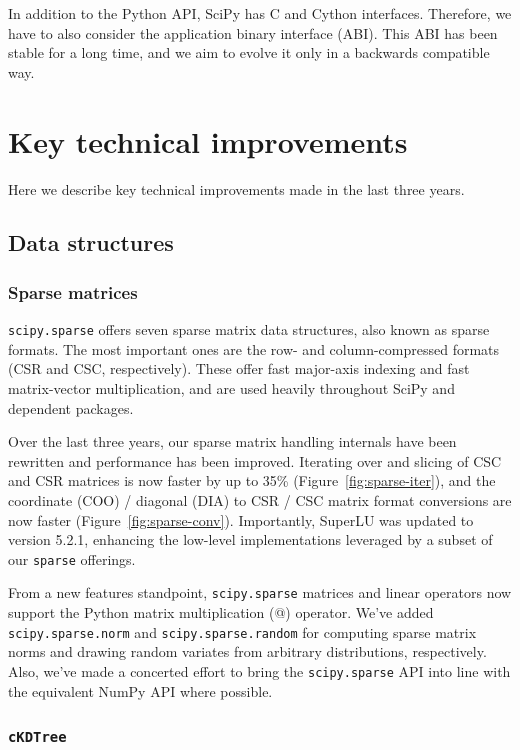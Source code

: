 \documentclass[fleqn,10pt]{wlscirep}
\begin{document}
In addition to the Python API, SciPy has C and Cython interfaces.
Therefore, we have to also consider the application binary
interface (ABI). This ABI has been stable for a long time, and we aim to
evolve it only in a backwards compatible way.

\section*{Key technical improvements}
\label{sec:technical_improvements}
Here we describe key technical improvements made in the last three years.

\subsection*{Data structures}

\subsubsection*{Sparse matrices}

\texttt{scipy.sparse} offers seven sparse matrix data structures,
also known as sparse formats. The most important ones are the row- 
and column-compressed formats (CSR and CSC, respectively). 
These offer fast major-axis indexing and fast matrix-vector multiplication,
and are used heavily throughout SciPy and dependent packages.

Over the last three years, our sparse matrix handling internals have been
rewritten and performance has been improved. Iterating over and slicing of CSC
and CSR matrices is now faster by up to 35\% (Figure~\ref{fig:sparse-iter}),
 and the coordinate (COO) / diagonal (DIA) to CSR / CSC matrix format
conversions are now faster (Figure~\ref{fig:sparse-conv}). Importantly,
SuperLU\cite{superlu_ug99} was updated to version 5.2.1, enhancing the
low-level implementations leveraged by a subset of our \texttt{sparse}
offerings.

From a new features standpoint, \texttt{scipy.sparse} matrices and linear
operators now support the Python matrix multiplication (@) operator.
We've added \texttt{scipy.sparse.norm} and
\texttt{scipy.sparse.random} for computing sparse matrix norms and drawing
random variates from arbitrary distributions, respectively. Also, we've made a
concerted effort to bring the \texttt{scipy.sparse} API into line with the
equivalent NumPy API where possible.

\subsubsection*{\texttt{cKDTree}}
\end{document}
